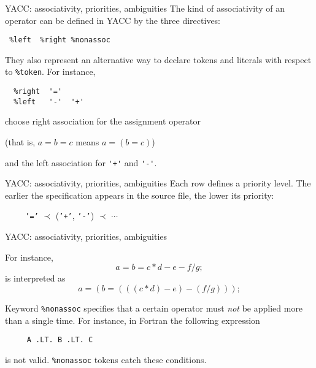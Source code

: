 \begin{frame}[fragile]{YACC: associativity, priorities, ambiguities}
The kind of associativity of an operator
can be defined in YACC by the three directives:


\vspace{20pt}

\verb" %left  %right %nonassoc "


\vspace{20pt}

They also represent an alternative way to declare tokens
and literals with respect to \verb"%token".
For instance,


\vspace{20pt}

\begin{verbatim}
  %right  '='
  %left   '-'  '+'
\end{verbatim}
choose right association for the assignment operator


\vspace{20pt}

(that is, $a=b=c$ means $a=(b=c)$)


\vspace{20pt}

and the left association for \verb"'+'" and \verb"'-'".

\end{frame}
\begin{frame}[fragile]{YACC: associativity, priorities, ambiguities}
Each row defines a priority level. The earlier the specification
appears in the source file, the lower its priority:


\vspace{20pt}

\verb"    " {\tt '='} $\prec$ ({\tt '+'}, {\tt '-'}) $\prec$ $\cdots$



\end{frame}
\begin{frame}[fragile]{YACC: associativity, priorities, ambiguities}

For instance,
\[ a = b = c*d-e-f/g; \]
is interpreted as
\[ a = (b = (((c*d)-e)-(f/g))); \]


\vspace{20pt}

Keyword \verb"%nonassoc" specifies that a certain
operator must {\em not\/} be applied more than a single time.
For instance, in Fortran the following expression 


\vspace{20pt}

\verb"     A .LT. B .LT. C"


\vspace{20pt}

is not valid. \verb"%nonassoc" tokens catch these conditions.





\end{frame}
